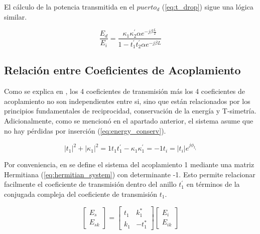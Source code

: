 El cálculo de la potencia transmitida en el $puerto_d$ (\ref{eq:t_drop}) sigue una
lógica similar.

\begin{equation}
\frac{E_d}{E_i} = \frac{ \kappa_1 \kappa_2^{'} \alpha e^{ -j \beta \frac{L}{2}} }
	   { 1 - t_1^{'} t_2^{'} \alpha e^{-j \beta L} }
\label{eq:t_drop}
\end{equation} 

\subsection{Relación entre Coeficientes de Acoplamiento}
\label{ss:params_relation}

Como se explica en \cite{yariv2006photonics}, los 4 coeficientes de transmisión más
los 4 coeficientes de acoplamiento no son independientes entre si, sino que están
relacionados por los principios fundamentales de reciprocidad, conservación de la energía
y T-simetría. Adicionalmente, como se mencionó en el apartado anterior, el sistema
asume que no hay pérdidas por inserción (\ref{eq:energy_conserv}). 

\begin{subequations}
\begin{equation}
|t_1|^2 + |\kappa_1|^2 = 1  \label{eq:energy_conserv} 
\end{equation} 
\begin{equation}
t_1 t_1^{'} - \kappa_1 \kappa_1^{'} = -1 \label{eq:unitary_matrix} 
\end{equation} 
\begin{equation}
t_i = |t_i|e^{j \phi_{t_i}} \label{eq:t_coef}
\end{equation} 
\end{subequations}

Por conveniencia, en \cite{yariv2006photonics} se define el sistema 
del acoplamiento 1 mediante una matriz Hermitiana
(\ref{eq:hermitian_system}) con determinante -1. 
Esto permite relacionar facilmente el coeficiente de transmisión dentro 
del anillo $t_1^{'}$ en términos de la conjugada 
compleja del coeficiente de transmisión $t_1$.

\begin{equation}
    \left[ \begin{array}{c} E_s \\ E_{sk} \end{array} \right] 
    =
    \begin{bmatrix} t_1 & k_1^* \\ k_1 & -t_1^* \end{bmatrix} 
    \left[ \begin{array}{c} E_i \\ E_{ik} \end{array} \right]
\label{eq:hermitian_system}
\end{equation} 

